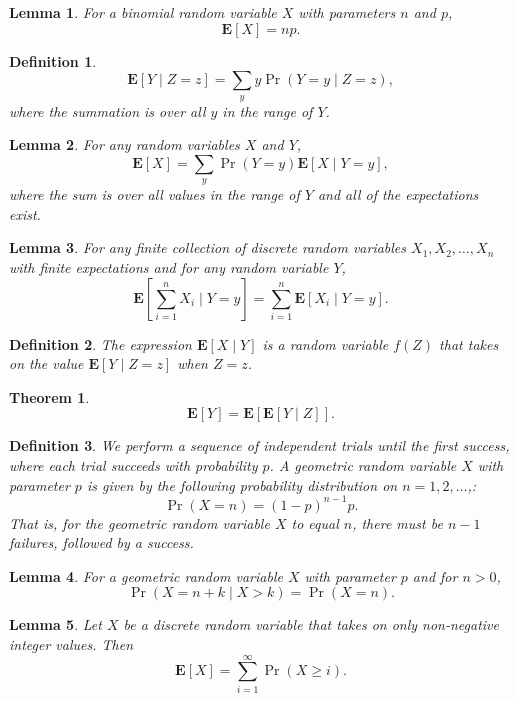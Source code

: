 \documentclass{amsart}
\newtheorem*{definition}{Definition}
\newtheorem*{theorem}{Theorem}
\newtheorem*{lemma}{Lemma}
\newcommand{\E}{\mathbf{E}}
\begin{document}
\begin{lemma}
  For a binomial random variable $X$ with parameters $n$ and $p$,
  \[
    \E[X] = np.
  \]
\end{lemma}

\begin{definition}
  \[
    \E[Y \mid Z = z] = \sum_y y \Pr(Y = y \mid Z = z),
  \]
  where the summation is over all $y$ in the range of $Y$.
\end{definition}

\begin{lemma}
  For any random variables $X$ and $Y$,
  \[
    \E[X] = \sum_y \Pr(Y = y) \E[X \mid Y = y],
  \]
  where the sum is over all values in the range of $Y$ and all of the
  expectations exist.
\end{lemma}

\begin{lemma}
  For any finite collection of discrete random variables $X_1, X_2, \ldots, X_n$
  with finite expectations and for any random variable $Y$,
  \[
    \E \left[ \sum_{i = 1}^n X_i \mid Y = y \right] = \sum_{i = 1}^n \E[X_i \mid
    Y = y].
  \]
\end{lemma}

\begin{definition}
  The expression $\E[X \mid Y]$ is a random variable $f(Z)$ that takes on the
  value $\E[Y \mid Z = z]$ when $Z = z$.
\end{definition}

\begin{theorem}
  \[
    \E[Y] = \E[\E[Y \mid Z]].
  \]
\end{theorem}

\begin{definition}
  We perform a sequence of independent trials until the first success, where
  each trial succeeds with probability $p$. A geometric random variable $X$ with
  parameter $p$ is given by the following probability distribution on $n = 1, 2,
  \ldots$,:
  \[
    \Pr(X = n) = {(1 - p)}^{n - 1} p.
  \]
  That is, for the geometric random variable $X$ to equal $n$, there must be $n
  - 1$ failures, followed by a success.
\end{definition}

\begin{lemma}
  For a geometric random variable $X$ with parameter $p$ and for $n > 0$,
  \[
    \Pr(X = n + k \mid X > k) = \Pr(X = n).
  \]
\end{lemma}

\begin{lemma}
  Let $X$ be a discrete random variable that takes on only non-negative integer
  values. Then
  \[
    \E[X] = \sum_{i = 1}^{\infty} \Pr(X \geq i).
  \]
\end{lemma}
\end{document}
